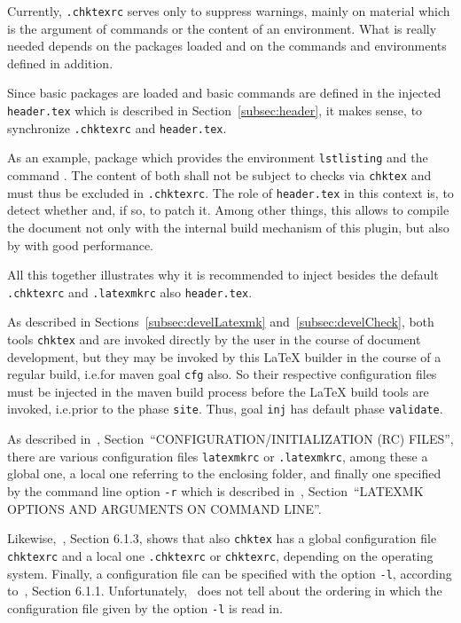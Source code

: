 Currently, \texttt{.chktexrc} serves only to suppress warnings, 
mainly on material which is the argument of commands or the content of an environment. 
What is really needed depends on the packages loaded 
and on the commands and environments defined in addition. 

Since basic packages are loaded and basic commands are defined 
in the injected \texttt{header.tex} 
which is described in Section~\ref{subsec:header}, 
it makes sense, to synchronize \texttt{.chktexrc} and \texttt{header.tex}. 

As an example, package  which provides the environment \texttt{lstlisting} 
and the command . 
The content of both shall not be subject to checks via \texttt{chktex} 
and must thus be excluded in \texttt{.chktexrc}. 
The role of \texttt{header.tex} in this context is, 
to detect whether  and, if so, to patch it. 
Among other things, this allows to compile the document 
not only with the internal build mechanism of this plugin, 
but also by  with good performance. 

All this together illustrates why it is recommended to inject 
besides the default \texttt{.chktexrc} and \texttt{.latexmkrc} 
also \texttt{header.tex}. 
\medskip


As described in Sections~\ref{subsec:develLatexmk} and~\ref{subsec:develCheck}, 
both tools \texttt{chktex} and  
are invoked directly by the user in the course of document development, 
but they may be invoked by this \LaTeX{} builder 
in the course of a regular build, 
i.e.\@ for maven goal \texttt{cfg} also. 
So their respective configuration files must be injected 
in the maven build process before the \LaTeX{} build tools are invoked, 
i.e.\@ prior to the phase \texttt{site}. 
Thus, goal \texttt{inj} has default phase \texttt{validate}. 

As described in~\cite{LatexMk23}, 
Section~``CONFIGURATION/INITIALIZATION (RC) FILES'', 
there are various configuration files \texttt{latexmkrc} or \texttt{.latexmkrc}, 
among these a global one, a local one referring to the enclosing folder, 
and finally one specified by the command line option \texttt{-r} 
which is described in~\cite{LatexMk23}, 
Section~``LATEXMK OPTIONS AND ARGUMENTS ON COMMAND LINE''. 

Likewise,~\cite{ChkTeX22}, Section 6.1.3, shows that also \texttt{chktex} 
has a global configuration file \texttt{chktexrc} 
and a local one \texttt{.chktexrc} or \texttt{chktexrc}, 
depending on the operating system. 
Finally, a configuration file can be specified with the option \texttt{-l}, 
according to~\cite{ChkTeX22}, Section 6.1.1. 
Unfortunately,~\cite{ChkTeX22} does not tell about the ordering 
in which the configuration file given by the option \texttt{-l} is read in. 

